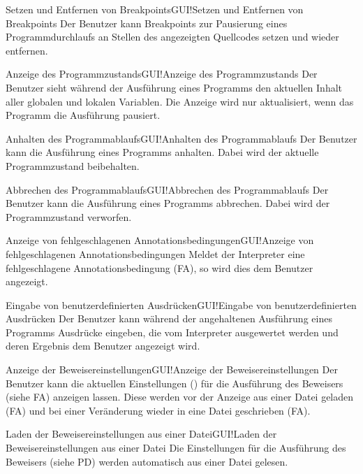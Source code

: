 \documentclass[a4paper,10pt]{article}
\begin{document}
\begin{FA}{Setzen und Entfernen von Breakpoints}{GUI!Setzen und Entfernen von Breakpoints}
Der Benutzer kann Breakpoints zur Pausierung eines Programmdurchlaufs an Stellen des angezeigten Quellcodes setzen und wieder entfernen.
\end{FA}
\begin{FA}{Anzeige des Programmzustands}{GUI!Anzeige des Programmzustands}
Der Benutzer sieht w\"{a}hrend der Ausf\"{u}hrung eines Programms den aktuellen Inhalt aller globalen und lokalen Variablen. Die Anzeige wird nur aktualisiert, wenn das Programm die Ausf\"{u}hrung pausiert.
\end{FA}
\begin{FA}{Anhalten des Programmablaufs}{GUI!Anhalten des Programmablaufs}
Der Benutzer kann die Ausf\"{u}hrung eines Programms anhalten. Dabei wird der aktuelle Programmzustand beibehalten.
\end{FA}
\begin{FA}{Abbrechen des Programmablaufs}{GUI!Abbrechen des Programmablaufs}
Der Benutzer kann die Ausf\"{u}hrung eines Programms abbrechen. Dabei wird der Programmzustand verworfen.
\end{FA}
\begin{FA}{Anzeige von fehlgeschlagenen Annotationsbedingungen}{GUI!Anzeige von fehlgeschlagenen Annotationsbedingungen}
Meldet der Interpreter eine fehlgeschlagene Annotationsbedingung (FA), so wird dies dem Benutzer angezeigt.
\end{FA}
\begin{FA}{Eingabe von benutzerdefinierten Ausdr\"{u}cken}{GUI!Eingabe von benutzerdefinierten Ausdr\"{u}cken}
Der Benutzer kann während der angehaltenen Ausf\"{u}hrung eines Programms Ausdr\"{u}cke eingeben, die vom Interpreter ausgewertet werden und deren Ergebnis dem Benutzer angezeigt wird.
\end{FA}
\begin{FA}{Anzeige der Beweisereinstellungen}{GUI!Anzeige der Beweisereinstellungen}
Der Benutzer kann die aktuellen Einstellungen () f\"{u}r die Ausf\"{u}hrung des Beweisers (siehe FA) anzeigen lassen. Diese werden vor der Anzeige aus einer Datei geladen (FA) und bei einer Ver\"{a}nderung wieder in eine Datei geschrieben (FA).
\end{FA}
\begin{FA}{Laden der Beweisereinstellungen aus einer Datei}{GUI!Laden der Beweisereinstellungen aus einer Datei}
Die Einstellungen f\"{u}r die Ausf\"{u}hrung des Beweisers (siehe PD) werden automatisch aus einer Datei gelesen.
\end{FA}
\end{document}
